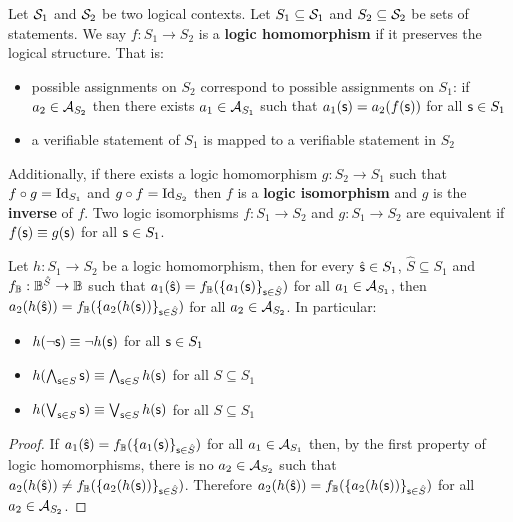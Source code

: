 \begin{mathSection}
	\begin{defn}
		Let $\logCtx_1$ and $\logCtx_2$ be two logical contexts. Let $S_1 \subseteq \logCtx_1$ and $S_2 \subseteq \logCtx_2$ be sets of statements. We say $f : S_1 \to S_2$ is a \textbf{logic homomorphism} if it preserves the logical structure. That is:
		\begin{itemize}
			\item possible assignments on $S_2$ correspond to possible assignments on $S_1$: if $a_2 \in \pAss[S_2]$ then there exists $a_1 \in \pAss[S_1]$ such that $a_1(\stmt) = a_2(f(\stmt))$ for all $\stmt \in S_1$
			\item a verifiable statement of $S_1$ is mapped to a verifiable statement in $S_2$
		\end{itemize}
		Additionally, if there exists a logic homomorphism $g : S_2 \to S_1$ such that $f \circ g = \Id_{S_1}$ and $g \circ f = \Id_{S_2}$ then $f$ is a \textbf{logic isomorphism} and $g$ is the \textbf{inverse} of $f$. Two logic isomorphisms $f : S_1 \to S_2$ and $g : S_1 \to S_2$ are equivalent if $f(\stmt)\equiv g(\stmt)$ for all $\stmt \in S_1$.
	\end{defn}
	
	\begin{coro}\label{pm-cd-logicHomomorphismPreservesBooleanAlgebra}
		Let $h : S_1 \to S_2$ be a logic homomorphism, then for every $\hat{\stmt} \in S_1$, $\hat{S} \subseteq S_1$ and $f_\Bool : \Bool^{\hat{S}} \to \Bool$ such that $a_1(\hat{\stmt}) = f_\Bool(\{ a_1(\stmt) \}_{\stmt \in \hat{S}})$ for all $a_1 \in \pAss[S_1]$, then $a_2(h(\hat{\stmt})) = f_\Bool(\{ a_2(h(\stmt)) \}_{\stmt \in \hat{S}})$ for all $a_2 \in \pAss[S_2]$. In particular:
		\begin{itemize}
			\item $h(\NOT \stmt) \equiv \NOT h(\stmt)$ for all $\stmt \in S_1$
			\item $h(\bigAND_{\stmt \in S} \stmt) \equiv \bigAND_{\stmt \in S} h(\stmt)$ for all $S \subseteq S_1$
			\item $h(\bigOR_{\stmt \in S} \stmt) \equiv \bigOR_{\stmt \in S} h(\stmt)$ for all $S \subseteq S_1$
		\end{itemize}
	\end{coro}
	
	\begin{proof}
		If $a_1(\hat{\stmt}) = f_\Bool(\{ a_1(\stmt) \}_{\stmt \in \hat{S}})$ for all $a_1 \in \pAss[S_1]$ then, by the first property of logic homomorphisms, there is no $a_2 \in \pAss[S_2]$ such that $a_2(h(\hat{\stmt})) \neq f_\Bool(\{ a_2(h(\stmt)) \}_{\stmt \in \hat{S}})$. Therefore $a_2(h(\hat{\stmt})) = f_\Bool(\{ a_2(h(\stmt)) \}_{\stmt \in \hat{S}})$ for all $a_2 \in \pAss[S_2]$.
		

\end{proof}
\end{mathSection}
